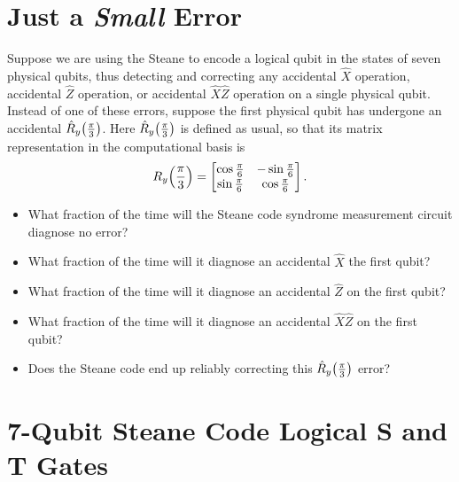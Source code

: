 \documentclass{../phys084}
\author{}
\date{2020 April Fools}
\begin{document}
\section{Just a \textit{Small} Error}

\begin{exercise}
  Suppose we are using the Steane to encode a logical qubit in the
  states of seven physical qubits, thus detecting and correcting any
  accidental \(\hat X\) operation, accidental \(\hat Z\) operation, or
  accidental \(\hat X \hat Z\) operation on a single physical qubit.
  Instead of one of these errors, suppose the first physical qubit has
  undergone an accidental \(\hat R_y \prn*{\frac \pi 3}\).  Here
  \(\hat R_y \prn*{\frac \pi 3}\) is defined as usual, so that its
  matrix representation in the computational basis is
  \[
    R_y \prn*{\frac \pi 3} =
    \begin{bmatrix}
      \cos \frac \pi 6 & -\sin \frac \pi 6 \\
      \sin \frac \pi 6 & \cos \frac \pi 6
    \end{bmatrix}.
  \]
  \begin{itemize}
  \item What fraction of the time will the Steane code syndrome
    measurement circuit diagnose no error?
  \item What fraction of the time will it diagnose an accidental
    \(\hat X\) the first qubit?
  \item What fraction of the time will it diagnose an accidental
    \(\hat Z\) on the first qubit?
  \item What fraction of the time will it diagnose an accidental
    \(\hat X \hat Z\) on the first qubit?
  \item Does the Steane code end up reliably correcting this
    \(\hat R_y \prn*{\frac \pi 3}\) error?
  \end{itemize}
\end{exercise}

\begin{solution}

\end{solution}

\section{7-Qubit Steane Code Logical S and T Gates}
\end{document}
